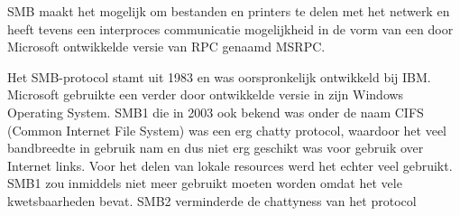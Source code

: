 SMB maakt het mogelijk om bestanden en printers te delen met het netwerk en heeft tevens een interproces communicatie mogelijkheid in de vorm van een door Microsoft ontwikkelde versie van RPC genaamd MSRPC.

Het SMB-protocol stamt uit 1983 en was oorspronkelijk ontwikkeld bij IBM. Microsoft gebruikte een verder door ontwikkelde versie in zijn Windows Operating System. SMB1 die in 2003 ook bekend was onder de naam CIFS (Common Internet File System) was een erg chatty protocol, waardoor het veel bandbreedte in gebruik nam en dus niet erg geschikt was voor gebruik over Internet links. Voor het delen van lokale resources werd het echter veel gebruikt. SMB1 zou inmiddels niet meer gebruikt moeten worden omdat het vele kwetsbaarheden bevat. SMB2 verminderde de chattyness van het protocol 
